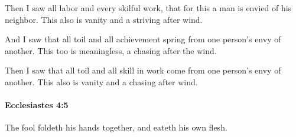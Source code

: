			\begin{versebox}
					\item[BHS] 
					\item[LXX] 
					\item[ASV] Then I saw all labor and every skilful work, that for this a man is envied of his neighbor. This also is vanity and a striving after wind.
					\item[NIV] And I saw that all toil and all achievement spring from one person’s envy of another. This too is meaningless, a chasing after the wind.
					\item[NRSV] Then I saw that all toil and all skill in work come from one person’s envy of another. This also is vanity and a chasing after wind.
			\end{versebox}

		\paragraph{Ecclesiastes 4:5} %
			\label{ECCLESIASTES-4-5}

			The fool foldeth his hands together, and eateth his own flesh.

